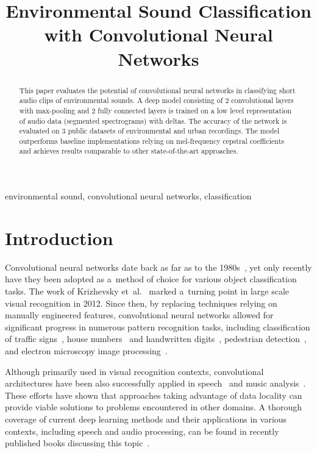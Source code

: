 \documentclass{article}
\title{Environmental Sound Classification\\with Convolutional Neural Networks}
\begin{document}
\maketitle

\emergencystretch=12pt

\begin{abstract}
This paper evaluates the potential of convolutional neural networks in classifying short audio clips of environmental sounds. A deep model consisting of 2 convolutional layers with max-pooling and 2 fully connected layers is trained on a low level representation of audio data (segmented spectrograms) with deltas. The accuracy of the network is evaluated on 3 public datasets of environmental and urban recordings. The model outperforms baseline implementations relying on mel-frequency cepstral coefficients and achieves results comparable to other state-of-the-art approaches.
\end{abstract}

\begin{keywords}
environmental sound, convolutional neural networks, classification
\end{keywords}

\section{Introduction}

Convolutional neural networks date back as far as to the 1980s~\cite{fukushima1980neocognitron,  lecun1989backpropagation, lecun1998gradient}, yet only recently have they been adopted as a~method of choice for various object classification tasks. The work of Krizhevsky et~al.~\cite{krizhevsky2012imagenet} marked a~turning point in large scale visual recognition \cite{ILSVRC15} in 2012. Since then, by replacing techniques relying on manually engineered features, convolutional neural networks allowed for significant progress in numerous pattern recognition tasks, including classification of traffic signs~\cite{ciresan2012traffic}, house numbers~\cite{goodfellow2013multi, sermanet2012convolutional} and handwritten digits~\cite{ciresan2012multi}, pedestrian detection~\cite{sermanet2013pedestrian}, and electron microscopy image processing~\cite{ciresan2012deep}.

Although primarily used in visual recognition contexts, convolutional architectures have been also successfully applied in speech~\cite{lee2009unsupervised, deng2013deep, abdel2014convolutional, sainath2013deep, abdel2012applying, abdel2013exploring, deng2013recent} and music analysis~\cite{dieleman2011audio, van2013deep}. These efforts have shown that approaches taking advantage of data locality can provide viable solutions to problems encountered in other domains. A thorough coverage of current deep learning methods and their applications in various contexts, including speech and audio processing, can be found in recently published books discussing this topic~\cite{bengio2015deeplearning, yu2015deeplearning, deng2014deep}.
\end{document}

